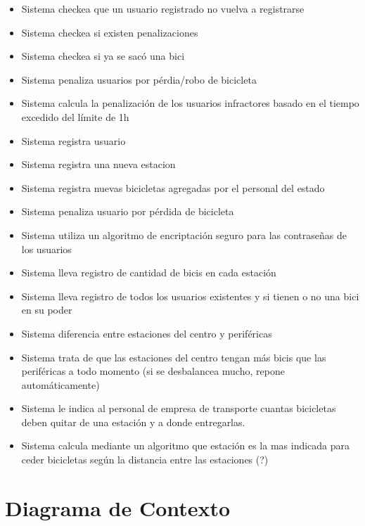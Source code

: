 \documentclass[a4paper, 10pt, twoside]{article}
\begin{document}
\begin{multicols}{2}
  \begin{itemize}
    \item Sistema checkea que un usuario registrado no vuelva a registrarse
    \item Sistema checkea si existen penalizaciones
    \item Sistema checkea si ya se sacó una bici
    \item Sistema penaliza usuarios por pérdia/robo de bicicleta
    \item Sistema calcula la penalización de los usuarios infractores basado en el tiempo excedido del límite de 1h
    \item Sistema registra usuario
    \item Sistema registra una nueva estacion
    \item Sistema registra nuevas bicicletas agregadas por el personal del estado
    \item Sistema penaliza usuario por pérdida de bicicleta
    \item Sistema utiliza un algoritmo de encriptación seguro para las contraseñas de los usuarios
    \item Sistema lleva registro de cantidad de bicis en cada estación 
    \item Sistema lleva registro de todos los usuarios existentes y si tienen o no una bici en su poder
    \item Sistema diferencia entre estaciones del centro y periféricas 
    \item Sistema trata de que las estaciones del centro tengan más bicis que las periféricas a todo momento (si se desbalancea mucho, repone automáticamente)
    \item Sistema le indica al personal de empresa de transporte cuantas bicicletas deben quitar de una estación y a donde entregarlas.
    \item Sistema calcula mediante un algoritmo que estación es la mas indicada para ceder bicicletas según la distancia entre las estaciones (?)
  \end{itemize}
\end{multicols}




\section{Diagrama de Contexto}
\end{document}

